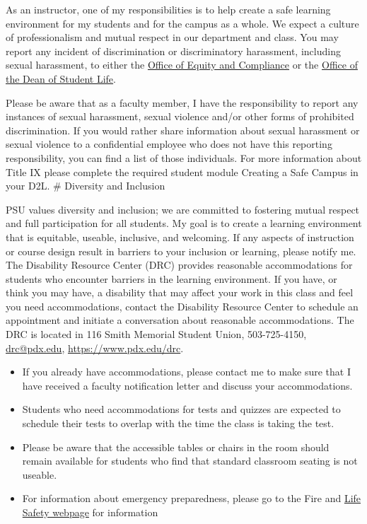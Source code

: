 \documentclass[11pt,]{article}
\begin{document}
As an instructor, one of my responsibilities is to help create a safe
learning environment for my students and for the campus as a whole. We
expect a culture of professionalism and mutual respect in our department
and class. You may report any incident of discrimination or
discriminatory harassment, including sexual harassment, to either the
\href{https://www.pdx.edu/diversity/office-of-equity-compliance}{Office
of Equity and Compliance} or the \href{https://www.pdx.edu/dos/}{Office
of the Dean of Student Life}.

Please be aware that as a faculty member, I have the responsibility to
report any instances of sexual harassment, sexual violence and/or other
forms of prohibited discrimination. If you would rather share
information about sexual harassment or sexual violence to a confidential
employee who does not have this reporting responsibility, you can find a
list of those individuals. For more information about Title IX please
complete the required student module Creating a Safe Campus in your D2L.
\# Diversity and Inclusion

PSU values diversity and inclusion; we are committed to fostering mutual
respect and full participation for all students. My goal is to create a
learning environment that is equitable, useable, inclusive, and
welcoming. If any aspects of instruction or course design result in
barriers to your inclusion or learning, please notify me. The Disability
Resource Center (DRC) provides reasonable accommodations for students
who encounter barriers in the learning environment. If you have, or
think you may have, a disability that may affect your work in this class
and feel you need accommodations, contact the Disability Resource Center
to schedule an appointment and initiate a conversation about reasonable
accommodations. The DRC is located in 116 Smith Memorial Student Union,
503-725-4150, \url{drc@pdx.edu}, \url{https://www.pdx.edu/drc}.

\begin{itemize}
\item
  If you already have accommodations, please contact me to make sure
  that I have received a faculty notification letter and discuss your
  accommodations.
\item
  Students who need accommodations for tests and quizzes are expected to
  schedule their tests to overlap with the time the class is taking the
  test.
\item
  Please be aware that the accessible tables or chairs in the room
  should remain available for students who find that standard classroom
  seating is not useable.
\item
  For information about emergency preparedness, please go to the Fire
  and
  \href{https://www.pdx.edu/environmental-health-safety/fire-and-life-safety}{Life
  Safety webpage} for information
\end{itemize}
\end{document}

